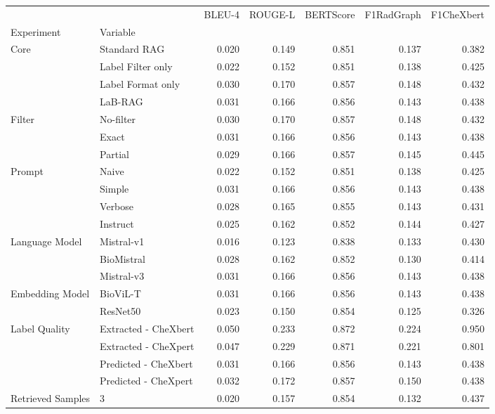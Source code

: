 \begin{tabular}{llrrrrr}
\toprule
 &  & BLEU-4 & ROUGE-L & BERTScore & F1RadGraph & F1CheXbert \\
Experiment & Variable &  &  &  &  &  \\
\midrule
\multirow[t]{4}{*}{Core} & Standard RAG & 0.020 & 0.149 & 0.851 & 0.137 & 0.382 \\
 & Label Filter only & 0.022 & 0.152 & 0.851 & 0.138 & 0.425 \\
 & Label Format only & 0.030 & 0.170 & 0.857 & 0.148 & 0.432 \\
 & LaB-RAG & 0.031 & 0.166 & 0.856 & 0.143 & 0.438 \\
\cline{1-7}
\multirow[t]{3}{*}{Filter} & No-filter & 0.030 & 0.170 & 0.857 & 0.148 & 0.432 \\
 & Exact & 0.031 & 0.166 & 0.856 & 0.143 & 0.438 \\
 & Partial & 0.029 & 0.166 & 0.857 & 0.145 & 0.445 \\
\cline{1-7}
\multirow[t]{4}{*}{Prompt} & Naive & 0.022 & 0.152 & 0.851 & 0.138 & 0.425 \\
 & Simple & 0.031 & 0.166 & 0.856 & 0.143 & 0.438 \\
 & Verbose & 0.028 & 0.165 & 0.855 & 0.143 & 0.431 \\
 & Instruct & 0.025 & 0.162 & 0.852 & 0.144 & 0.427 \\
\cline{1-7}
\multirow[t]{3}{*}{Language Model} & Mistral-v1 & 0.016 & 0.123 & 0.838 & 0.133 & 0.430 \\
 & BioMistral & 0.028 & 0.162 & 0.852 & 0.130 & 0.414 \\
 & Mistral-v3 & 0.031 & 0.166 & 0.856 & 0.143 & 0.438 \\
\cline{1-7}
\multirow[t]{2}{*}{Embedding Model} & BioViL-T & 0.031 & 0.166 & 0.856 & 0.143 & 0.438 \\
 & ResNet50 & 0.023 & 0.150 & 0.854 & 0.125 & 0.326 \\
\cline{1-7}
\multirow[t]{4}{*}{Label Quality} & Extracted - CheXbert & 0.050 & 0.233 & 0.872 & 0.224 & 0.950 \\
 & Extracted - CheXpert & 0.047 & 0.229 & 0.871 & 0.221 & 0.801 \\
 & Predicted - CheXbert & 0.031 & 0.166 & 0.856 & 0.143 & 0.438 \\
 & Predicted - CheXpert & 0.032 & 0.172 & 0.857 & 0.150 & 0.438 \\
\cline{1-7}
\multirow[t]{3}{*}{Retrieved Samples} & 3 & 0.020 & 0.157 & 0.854 & 0.132 & 0.437 \\

\end{tabular}
